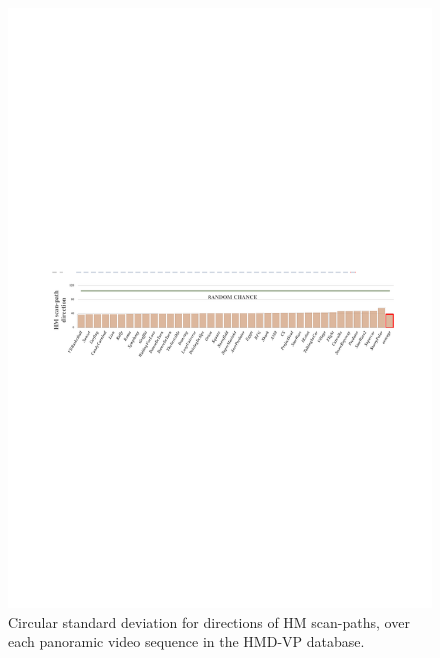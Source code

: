 \documentclass[10pt,journal,compsoc]{IEEEtran}
\begin{document}
\begin{figure}
	\begin{center}
		\centerline{\includegraphics[width=2\columnwidth]{figures/database/direction-consistence2}}%
		\caption{\footnotesize{Circular standard deviation for directions of HM scan-paths, over each panoramic video sequence in the HMD-VP database.}}
		\label{direction-consistence}
	\end{center}
\end{figure}
\end{document}
